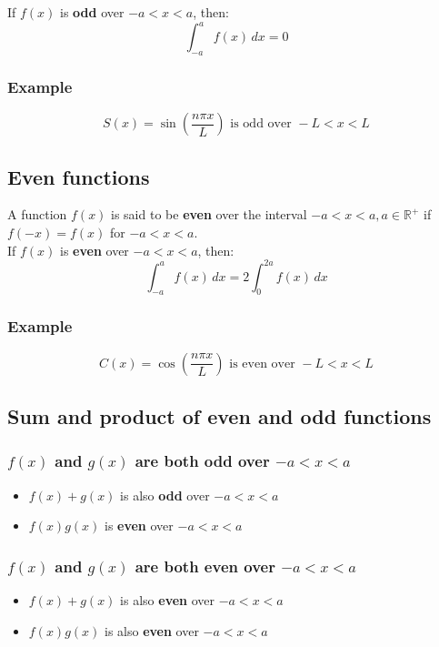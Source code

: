 \documentclass[11pt]{article}
\begin{document}
If \(f(x)\) is \textbf{odd} over \(-a < x < a\), then:
\[\int_{-a}^{a} f(x) \, dx = 0\]
\subsubsection{Example}
\label{sec:orgf19a0ff}
\[S(x) = \sin \left( \frac{n \pi x}{L} \right) \text{ is odd over } -L < x < L\]
\subsection{Even functions}
\label{sec:orga2b65f9}
A function \(f(x)\) is said to be \textbf{even} over the interval \(- a < x < a, a \in \mathbb{R}^{+}\) if \(f(-x) = f(x)\) for \(-a < x < a\).  \\

If \(f(x)\) is \textbf{even} over \(-a < x < a\), then:
\[\int_{-a}^{a} f(x) \, dx = 2 \int_0^{2a} f(x) \, dx\]
\subsubsection{Example}
\label{sec:orgf15408d}
\[C(x) = \cos \left( \frac{n \pi x}{L} \right) \text{ is even over } -L < x < L\]

 \newpage
\subsection{Sum and product of even and odd functions}
\label{sec:orge456189}

\subsubsection{\(f(x)\) and \(g(x)\) are both odd over \(- a < x < a\)}
\label{sec:orgd0d9474}
\begin{itemize}
\item \(f(x) + g(x)\) is also \textbf{odd} over \(- a < x < a\)
\item \(f(x) g(x)\) is \textbf{even} over \(- a < x < a\)
\end{itemize}
\subsubsection{\(f(x)\) and \(g(x)\) are both even over \(- a < x < a\)}
\label{sec:orgf709b5e}
\begin{itemize}
\item \(f(x) + g(x)\) is also \textbf{even} over \(- a < x < a\)
\item \(f(x) g(x)\) is also \textbf{even} over \(- a < x < a\)
\end{itemize}
\end{document}
